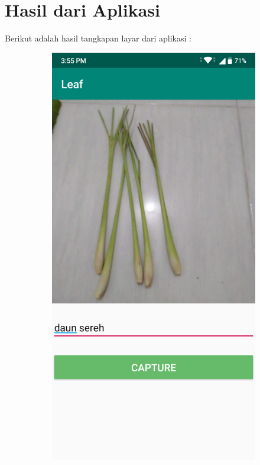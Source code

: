 \section{Hasil dari Aplikasi}
Berikut adalah hasil tangkapan layar dari aplikasi :

\begin{figure}[ht]
\begin{subfigure}{0.5\textwidth}
	\centering\includegraphics[width=\linewidth]{bab5/figures/uploadsereh.png}

\end{subfigure}
\end{figure}
